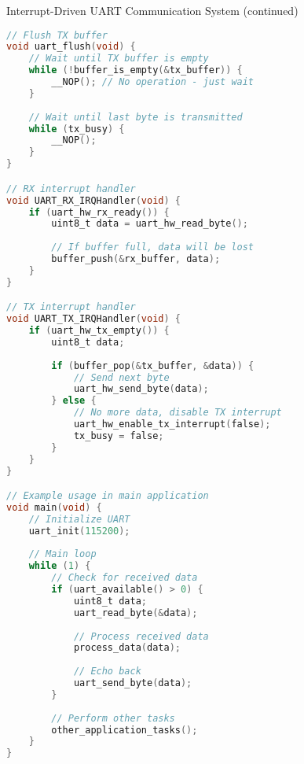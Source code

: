 \begin{example2}{Interrupt-Driven UART Communication System (continued)}
\begin{lstlisting}[language=C, style=basesmol]
// Flush TX buffer
void uart_flush(void) {
    // Wait until TX buffer is empty
    while (!buffer_is_empty(&tx_buffer)) {
        __NOP(); // No operation - just wait
    }
    
    // Wait until last byte is transmitted
    while (tx_busy) {
        __NOP();
    }
}

// RX interrupt handler
void UART_RX_IRQHandler(void) {
    if (uart_hw_rx_ready()) {
        uint8_t data = uart_hw_read_byte();
        
        // If buffer full, data will be lost
        buffer_push(&rx_buffer, data);
    }
}

// TX interrupt handler
void UART_TX_IRQHandler(void) {
    if (uart_hw_tx_empty()) {
        uint8_t data;
        
        if (buffer_pop(&tx_buffer, &data)) {
            // Send next byte
            uart_hw_send_byte(data);
        } else {
            // No more data, disable TX interrupt
            uart_hw_enable_tx_interrupt(false);
            tx_busy = false;
        }
    }
}

// Example usage in main application
void main(void) {
    // Initialize UART
    uart_init(115200);
    
    // Main loop
    while (1) {
        // Check for received data
        if (uart_available() > 0) {
            uint8_t data;
            uart_read_byte(&data);
            
            // Process received data
            process_data(data);
            
            // Echo back
            uart_send_byte(data);
        }
        
        // Perform other tasks
        other_application_tasks();
    }
}
\end{lstlisting}
\end{example2}


